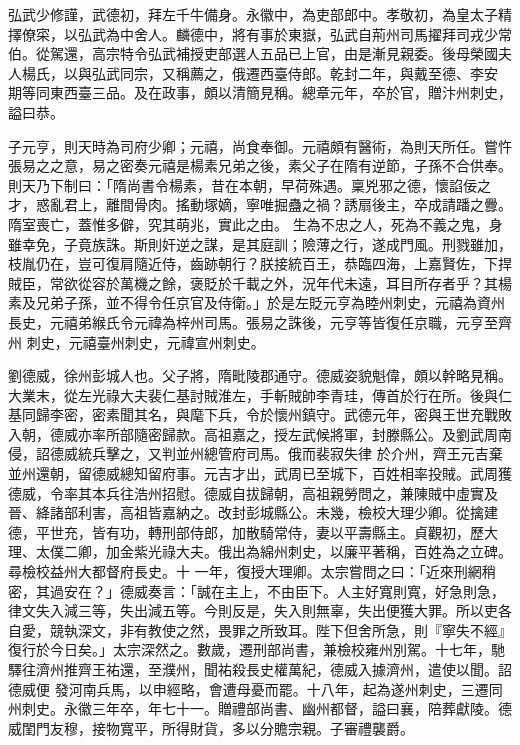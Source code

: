 \begin{pinyinscope}
 弘武少修謹，武德初，拜左千牛備身。永徽中，為吏部郎中。孝敬初，為皇太子精擇僚寀，以弘武為中舍人。麟德中，將有事於東嶽，弘武自荊州司馬擢拜司戎少常伯。從駕還，高宗特令弘武補授吏部選人五品已上官，由是漸見親委。後母榮國夫人楊氏，以與弘武同宗，又稱薦之，俄遷西臺侍郎。乾封二年，與戴至德、李安
 期等同東西臺三品。及在政事，頗以清簡見稱。總章元年，卒於官，贈汴州刺史，謚曰恭。



 子元亨，則天時為司府少卿；元禧，尚食奉御。元禧頗有醫術，為則天所任。嘗忤張易之之意，易之密奏元禧是楊素兄弟之後，素父子在隋有逆節，子孫不合供奉。則天乃下制曰：「隋尚書令楊素，昔在本朝，早荷殊遇。稟兇邪之德，懷諂佞之才，惑亂君上，離間骨肉。搖動塚嫡，寧唯掘蠱之禍？誘扇後主，卒成請蹯之釁。隋室喪亡，蓋惟多僻，究其萌兆，實此之由。
 生為不忠之人，死為不義之鬼，身雖幸免，子竟族誅。斯則奸逆之謀，是其庭訓；險薄之行，遂成門風。刑戮雖加，枝胤仍在，豈可復肩隨近侍，齒跡朝行？朕接統百王，恭臨四海，上嘉賢佐，下捍賊臣，常欲從容於萬機之餘，褒貶於千載之外，況年代未遠，耳目所存者乎？其楊素及兄弟子孫，並不得令任京官及侍衛。」於是左貶元亨為睦州刺史，元禧為資州長史，元禧弟緱氏令元禕為梓州司馬。張易之誅後，元亨等皆復任京職，元亨至齊州
 刺史，元禧臺州刺史，元禕宣州刺史。



 劉德威，徐州彭城人也。父子將，隋毗陵郡通守。德威姿貌魁偉，頗以幹略見稱。大業末，從左光祿大夫裴仁基討賊淮左，手斬賊帥李青珪，傳首於行在所。後與仁基同歸李密，密素聞其名，與麾下兵，令於懷州鎮守。武德元年，密與王世充戰敗入朝，德威亦率所部隨密歸款。高祖嘉之，授左武候將軍，封滕縣公。及劉武周南侵，詔德威統兵擊之，又判並州總管府司馬。俄而裴寂失律
 於介州，齊王元吉棄並州還朝，留德威總知留府事。元吉才出，武周已至城下，百姓相率投賊。武周獲德威，令率其本兵往浩州招慰。德威自拔歸朝，高祖親勞問之，兼陳賊中虛實及晉、絳諸部利害，高祖皆嘉納之。改封彭城縣公。未幾，檢校大理少卿。從擒建德，平世充，皆有功，轉刑部侍郎，加散騎常侍，妻以平壽縣主。貞觀初，歷大理、太僕二卿，加金紫光祿大夫。俄出為綿州刺史，以廉平著稱，百姓為之立碑。尋檢校益州大都督府長史。十
 一年，復授大理卿。太宗嘗問之曰：「近來刑網稍密，其過安在？」德威奏言：「誠在主上，不由臣下。人主好寬則寬，好急則急，律文失入減三等，失出減五等。今則反是，失入則無辜，失出便獲大罪。所以吏各自愛，競執深文，非有教使之然，畏罪之所致耳。陛下但舍所急，則『寧失不經』復行於今日矣。」太宗深然之。數歲，遷刑部尚書，兼檢校雍州別駕。十七年，馳驛往濟州推齊王祐還，至濮州，聞祐殺長史權萬紀，德威入據濟州，遣使以聞。詔德威便
 發河南兵馬，以申經略，會遭母憂而罷。十八年，起為遂州刺史，三遷同州刺史。永徽三年卒，年七十一。贈禮部尚書、幽州都督，謚曰襄，陪葬獻陵。德威閨門友穆，接物寬平，所得財貨，多以分贍宗親。子審禮襲爵。




\end{pinyinscope}
